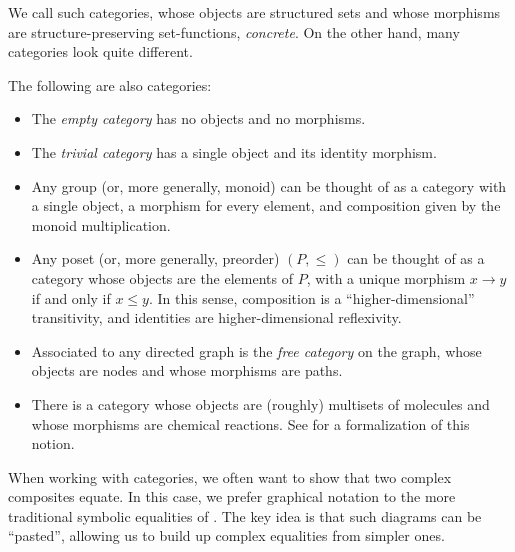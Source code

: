 \noindent
We call such categories, whose objects are structured sets and whose morphisms
are structure-preserving set-functions, \emph{concrete}. On the other hand, many
categories look quite different.

\begin{ex}\label{ex:abstract categories}The following are also categories:
  \begin{itemize}
    \item The \emph{empty category} has no objects and no morphisms.
    \item The \emph{trivial category} has a single object and its identity morphism.
    \item Any group (or, more generally, monoid) can be thought of as a category
      with a single object, a morphism for every element, and composition
      given by the monoid multiplication.
    \item Any poset (or, more generally, preorder) $(P, \leq)$ can be thought
      of as a category whose objects are the elements of $P$, with a unique
      morphism $x\rightarrow y$ if and only if $x\leq y$. In this sense,
      composition is a ``higher-dimensional'' transitivity, and identities are
      higher-dimensional reflexivity.
    \item Associated to any directed graph is the \emph{free category} on the
      graph, whose objects are nodes and whose morphisms are paths.
		\item There is a category whose objects are (roughly) multisets of molecules
			and whose morphisms are chemical reactions. See \cite{baez-2017} for a
			formalization of this notion.
  \end{itemize}
\end{ex}


\noindent
When working with categories, we often want to show that two complex composites
equate. In this case, we prefer graphical notation to the more traditional
symbolic equalities of . The key idea is that such diagrams
can be ``pasted'', allowing us to build up complex equalities from simpler ones.

